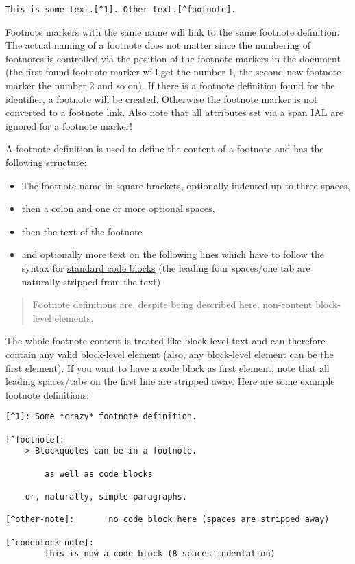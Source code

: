 \documentclass[a4paper]{article}
\begin{document}
\begin{verbatim}
This is some text.[^1]. Other text.[^footnote].
\end{verbatim}

Footnote markers with the same name will link to the same footnote
definition. The actual naming of a footnote does not matter since the
numbering of footnotes is controlled via the position of the footnote
markers in the document (the first found footnote marker will get the
number 1, the second new footnote marker the number 2 and so on). If
there is a footnote definition found for the identifier, a footnote will
be created. Otherwise the footnote marker is not converted to a footnote
link. Also note that all attributes set via a span IAL are ignored for a
footnote marker!

A footnote definition is used to define the content of a footnote and
has the following structure:

\begin{itemize}
\item
  The footnote name in square brackets, optionally indented up to three
  spaces,
\item
  then a colon and one or more optional spaces,
\item
  then the text of the footnote
\item
  and optionally more text on the following lines which have to follow
  the syntax for \protect\hyperlink{standard-code-blocks}{standard code
  blocks} (the leading four spaces/one tab are naturally stripped from
  the text)
\end{itemize}

\begin{quote}
Footnote definitions are, despite being described here, non-content
block-level elements.
\end{quote}

The whole footnote content is treated like block-level text and can
therefore contain any valid block-level element (also, any block-level
element can be the first element). If you want to have a code block as
first element, note that all leading spaces/tabs on the first line are
stripped away. Here are some example footnote definitions:

\begin{verbatim}
[^1]: Some *crazy* footnote definition.

[^footnote]:
    > Blockquotes can be in a footnote.

        as well as code blocks

    or, naturally, simple paragraphs.

[^other-note]:       no code block here (spaces are stripped away)

[^codeblock-note]:
        this is now a code block (8 spaces indentation)
\end{verbatim}
\end{document}
